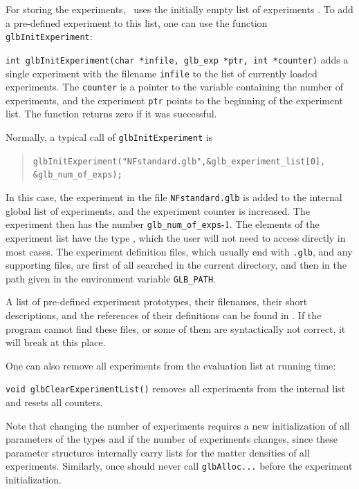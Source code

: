  
For storing the experiments, \GLOBES\ uses the initially empty list of experiments . To add a pre-defined experiment to this list, one can use the function {\tt glbInitExperiment}:
\begin{function}
{\tt int glbInitExperiment(char *infile, glb\_exp *ptr, int *counter)}
 adds a single experiment with the filename {\tt infile} to the list of currently loaded experiments. The {\tt counter} is a pointer to the 
 variable containing the number of experiments, and the experiment {\tt ptr}
 points to the beginning of the experiment list. The function returns
 zero if it was successful. 
\end{function}
Normally, a typical  call of {\tt glbInitExperiment} is 
\begin{quote}
{\tt glbInitExperiment("NFstandard.glb",\&glb\_experiment\_list[0],\\  \hspace*{8cm} \&glb\_num\_of\_exps); }
\end{quote}
In this case, the experiment in the file {\tt NFstandard.glb} is added to the internal global list of experiments, and the experiment counter is increased. The
experiment then has the number {\tt glb\_num\_of\_exps}-1. The elements
of the experiment list have the type , which the
user will not need to access directly in most cases. The experiment definition files, which usually end with {\tt .glb}, and any
supporting files, are first of all searched in the current directory, and then in the path given in the environment variable \verb+GLB_PATH+.
%
%

A list of pre-defined experiment prototypes, their filenames, their short descriptions, and the references of their definitions can be found in . If the program cannot find these files, or some of them are syntactically not correct, it will break at this place. 

One can also remove all experiments from the evaluation list at running
 time:
\begin{function}
{\tt void glbClearExperimentList()} removes all experiments from the internal list and resets all counters.   
\end{function}
Note that changing the number of experiments requires a new initialization
of all parameters of the types  and 
if the number of experiments changes, since these parameter structures internally carry lists for the matter densities of all experiments. Similarly, once should never call {\tt glbAlloc...} before the
experiment initialization.

